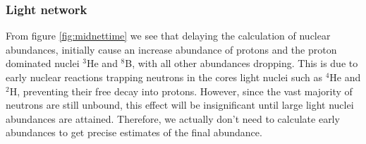 \subsubsection{Light network}

From figure \ref{fig:midnettime} we see that delaying the calculation of nuclear abundances, initially cause an increase abundance of protons and the proton dominated nuclei ${}^3$He and ${}^8$B, with all other abundances dropping. This is due to early nuclear reactions trapping neutrons in the cores light nuclei such as ${}^4$He and ${}^2$H, preventing their free decay into protons. However, since the vast majority of neutrons are still unbound, this effect will be insignificant until large light nuclei abundances are attained. Therefore, we actually don't need to calculate early abundances to get precise estimates of the final abundance. 

